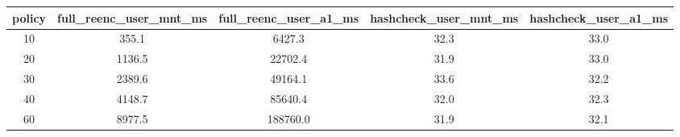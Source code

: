 \begin{tabular}{c c c c c}
\toprule
policy & full\_reenc\_user\_mnt\_ms & full\_reenc\_user\_a1\_ms & hashcheck\_user\_mnt\_ms & hashcheck\_user\_a1\_ms \\
\midrule
10 & 355.1 & 6427.3 & 32.3 & 33.0 \\
20 & 1136.5 & 22702.4 & 31.9 & 33.0 \\
30 & 2389.6 & 49164.1 & 33.6 & 32.2 \\
40 & 4148.7 & 85640.4 & 32.0 & 32.3 \\
60 & 8977.5 & 188760.0 & 31.9 & 32.1 \\
\bottomrule
\end{tabular}
